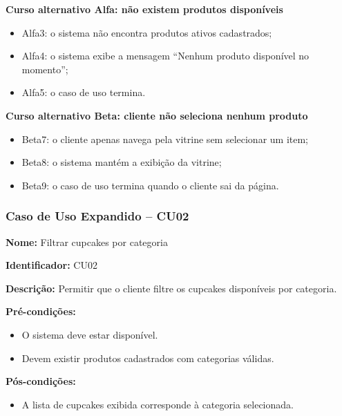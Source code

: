 \documentclass[12pt]{article}
\begin{document}
\textbf{Curso alternativo Alfa: não existem produtos disponíveis}

\begin{itemize}
\item Alfa3: o sistema não encontra produtos ativos cadastrados;
\item Alfa4: o sistema exibe a mensagem ``Nenhum produto disponível no momento'';
\item Alfa5: o caso de uso termina.
\end{itemize}

\textbf{Curso alternativo Beta: cliente não seleciona nenhum produto}

\begin{itemize}
\item Beta7: o cliente apenas navega pela vitrine sem selecionar um item;
\item Beta8: o sistema mantém a exibição da vitrine;
\item Beta9: o caso de uso termina quando o cliente sai da página.
\end{itemize}


\subsubsection{Caso de Uso Expandido -- CU02}

\textbf{Nome:} Filtrar cupcakes por categoria

\textbf{Identificador:} CU02

\textbf{Descrição:} Permitir que o cliente filtre os cupcakes disponíveis por categoria.

\textbf{Pré-condições:}
\begin{itemize}
\item O sistema deve estar disponível.
\item Devem existir produtos cadastrados com categorias válidas.
\end{itemize}

\textbf{Pós-condições:}
\begin{itemize}
\item A lista de cupcakes exibida corresponde à categoria selecionada.
\end{itemize}
\end{document}
